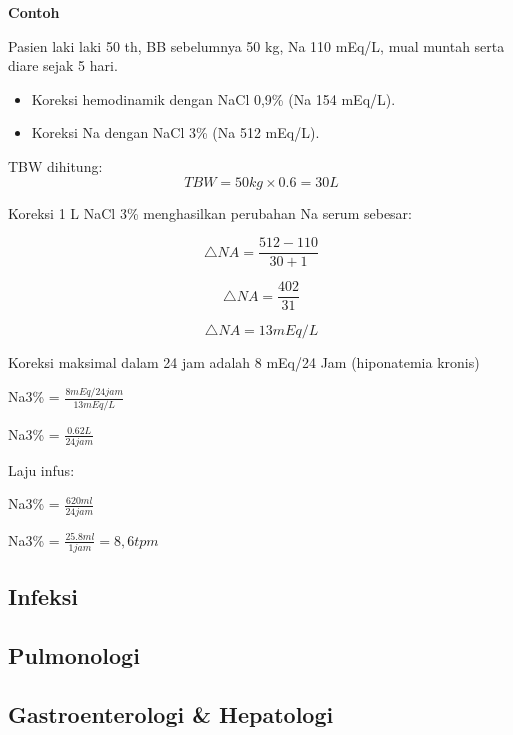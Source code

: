 \documentclass[
]{book}
\providecommand{\tightlist}{%
  \setlength{\itemsep}{0pt}\setlength{\parskip}{0pt}}
\begin{document}
\textbf{Contoh}

Pasien laki laki 50 th, BB sebelumnya 50 kg, Na 110 mEq/L, mual muntah serta diare sejak 5 hari.

\begin{itemize}
\tightlist
\item
  Koreksi hemodinamik dengan NaCl 0,9\% (Na 154 mEq/L).
\item
  Koreksi Na dengan NaCl 3\% (Na 512 mEq/L).
\end{itemize}

TBW dihitung:
\begin{equation}
\ TBW = 50 kg \times 0.6 = 30 L
\end{equation}

Koreksi 1 L NaCl 3\% menghasilkan perubahan Na serum sebesar:

\begin{equation}
\ \triangle NA = \frac{512 - 110}{30 + 1}
\end{equation}

\begin{equation}
\ \triangle NA = \frac{402}{31}
\end{equation}

\begin{equation}
\ \triangle NA = 13 mEq/L
\end{equation}

Koreksi maksimal dalam 24 jam adalah 8 mEq/24 Jam (hiponatemia kronis)

Na3\% = \(\frac{8 mEq/24 jam}{13 mEq/L}\)

Na3\% = \(\frac{0.62 L}{24 jam}\)

Laju infus:

Na3\% = \(\frac{620 ml}{24 jam}\)

Na3\% = \(\frac{25.8 ml}{1 jam} = 8,6 tpm\)

\hypertarget{infeksi}{%
\subsection{Infeksi}\label{infeksi}}

\hypertarget{pulmonologi-1}{%
\subsection{Pulmonologi}\label{pulmonologi-1}}

\hypertarget{gastroenterologi-hepatologi}{%
\subsection{Gastroenterologi \& Hepatologi}\label{gastroenterologi-hepatologi}}
\end{document}
